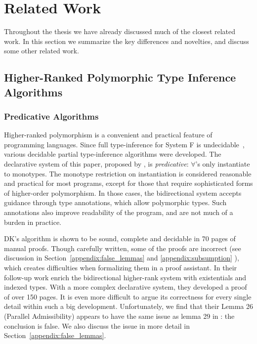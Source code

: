 \chapter{Related Work}
\label{chap:related}

Throughout the thesis we have already discussed much of the closest related work.
In this section we summarize the key differences and novelties,
and discuss some other related work.

\section{Higher-Ranked Polymorphic Type Inference Algorithms}

\subsection{Predicative Algorithms}

Higher-ranked polymorphism is a convenient and practical feature of
programming languages.  Since full type-inference for System F is
undecidable~\citep{wells1999typability}, various decidable partial
type-inference algorithms were developed.
The declarative system of this paper,
proposed by \citet{dunfield2013complete}, is \emph{predicative}: 
$\forall$'s only instantiate to monotypes.  The monotype restriction
on instantiation is considered reasonable and practical for most
programs, except for those that require sophisticated forms of
higher-order polymorphism.  In those cases, the bidirectional system
accepts guidance through type annotations, which allow polymorphic types.
Such annotations also improve
readability of the program, and are not much of a burden in practice.

DK's algorithm is shown to be sound, complete and decidable in 70 pages of manual proofs.
Though carefully written, some of the proofs are incorrect
(see discussion in Section~\ref{appendix:false_lemmas} and \ref{appendix:subsumption}
),
which creates difficulties when formalizing them in a proof assistant.
In their follow-up work \citep{DunfieldIndexed} enrich the bidirectional higher-rank system with
existentials and indexed types.
With a more complex declarative system, they developed a proof of over 150 pages.
It is even more difficult to argue its correctness for every single detail
within such a big development.
Unfortunately, we find that their Lemma 26 (Parallel Admissibility) appears to have the same issue 
as lemma 29 in \citep{dunfield2013complete}: the conclusion is false. We also discuss
the issue in more detail in Section~\ref{appendix:false_lemmas}.

